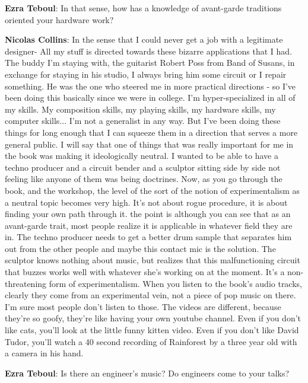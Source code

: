 \textbf{Ezra Teboul}: In that sense, how has a knowledge of avant-garde traditions oriented your hardware work?
					
\textbf{Nicolas Collins}: In the sense that I could never get a job with a legitimate designer- All my stuff is directed towards these bizarre applications that I had.  The buddy I’m staying with, the guitarist Robert Poss from Band of Susans, in exchange for staying in his studio, I always bring him some circuit or I repair something. He was the one who steered me in more practical directions - so I’ve been doing this basically since we were in college. I’m hyper-specialized in all of my skills. My composition skills, my playing skills, my hardware skills, my computer skills... I’m not a generalist in any way. But I’ve been doing these things for long enough that I can squeeze them in a direction that serves a more general public. I will say that one of things that was really important for me in the book was making it ideologically neutral. I wanted to be able to have a techno producer and a circuit bender and a sculptor sitting side by side not feeling like anyone of them was being doctrines. Now, as you go through the book, and the workshop, the level of the sort of the notion of experimentalism as a neutral topic becomes very high. It’s not  about rogue procedure, it is about finding your own path through it. the point is although you can see that as an avant-garde trait, most people realize it is applicable in whatever field they are in. The techno producer needs to get a better drum sample that separates him out from the other people and maybe this contact mic is the solution. The sculptor knows nothing about music, but realizes that this malfunctioning circuit that buzzes works well with whatever she’s working on at the moment. It’s a non-threatening form of experimentalism. When you listen to the book’s audio tracks, clearly they come from an experimental vein, not a piece of pop music on there. I’m sure most people don’t listen to those. The videos are different, because they’re so goofy, they’re like having your own youtube channel. Even if you don’t like cats, you’ll look at the little funny kitten video. Even if you don’t like David Tudor, you’ll watch a 40 second recording of Rainforest by a three year old with a camera in his hand.
					
\textbf{Ezra Teboul}: Is there an engineer’s music? Do engineers come to your talks?
					
